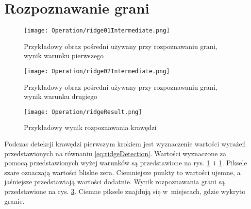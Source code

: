 \section{Rozpoznawanie grani}
\label{sec:dzialanieRidge}

\begin{figure}[h]
\begin{center}
\texttt{[image: Operation/ridge01Intermediate.png]}
\end{center}
\caption{Przykładowy obraz pośredni używany przy rozpoznawaniu grani, wynik warunku pierwszego}
\label{fig:ridgeIntermediate1}
\end{figure}

\begin{figure}[h]
\begin{center}
\texttt{[image: Operation/ridge02Intermediate.png]}
\end{center}
\caption{Przykładowy obraz pośredni używany przy rozpoznawaniu grani, wynik warunku drugiego}
\label{fig:ridgeIntermediate2}
\end{figure}

\begin{figure}[h]
\begin{center}
\texttt{[image: Operation/ridgeResult.png]}
\end{center}
\caption{Przykładowy wynik rozpoznawania krawędzi}
\label{fig:ridgeResult}
\end{figure}

Podczas detekcji krawędzi pierwszym krokiem jest wyznaczenie wartości wyrażeń przedstawionych na równaniu \eqref{eq:ridgeDetection}. Wartości wyznaczone za pomocą przedstawionych wyżej warunków są przedstawione na rys. \ref{fig:ridgeIntermediate1}~i~\ref{fig:ridgeIntermediate1}. Piksele szare oznaczają wartości bliskie zera. Ciemniejsze punkty to wartości ujemne, a jaśniejsze przedstawiają wartości dodatnie. Wynik rozpoznawania grani są przedstawione na rys. \ref{fig:ridgeResult}. Ciemne piksele znajdują się w~miejscach, gdzie wykryto granie.
